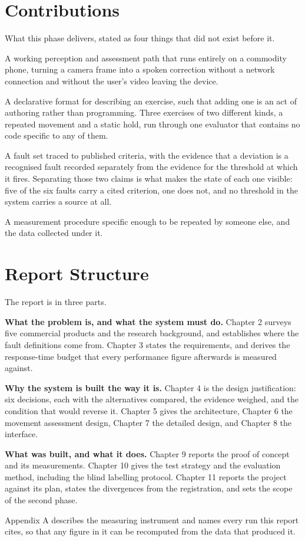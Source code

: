 \section{Contributions}
\label{sec:1.5}

What this phase delivers, stated as four things that did not exist before it.

A working perception and assessment path that runs entirely on a commodity phone, turning a camera frame into a spoken correction without a network connection and without the user's video leaving the device.

A declarative format for describing an exercise, such that adding one is an act of authoring rather than programming. Three exercises of two different kinds, a repeated movement and a static hold, run through one evaluator that contains no code specific to any of them.

A fault set traced to published criteria, with the evidence that a deviation is a recognised fault recorded separately from the evidence for the threshold at which it fires. Separating those two claims is what makes the state of each one visible: five of the six faults carry a cited criterion, one does not, and no threshold in the system carries a source at all.

A measurement procedure specific enough to be repeated by someone else, and the data collected under it.

\section{Report Structure}
\label{sec:1.6}

The report is in three parts.

\textbf{What the problem is, and what the system must do.} Chapter 2 surveys five commercial products and the research background, and establishes where the fault definitions come from. Chapter 3 states the requirements, and derives the response-time budget that every performance figure afterwards is measured against.

\textbf{Why the system is built the way it is.} Chapter 4 is the design justification: six decisions, each with the alternatives compared, the evidence weighed, and the condition that would reverse it. Chapter 5 gives the architecture, Chapter 6 the movement assessment design, Chapter 7 the detailed design, and Chapter 8 the interface.

\textbf{What was built, and what it does.} Chapter 9 reports the proof of concept and its measurements. Chapter 10 gives the test strategy and the evaluation method, including the blind labelling protocol. Chapter 11 reports the project against its plan, states the divergences from the registration, and sets the scope of the second phase.

Appendix A describes the measuring instrument and names every run this report cites, so that any figure in it can be recomputed from the data that produced it.

